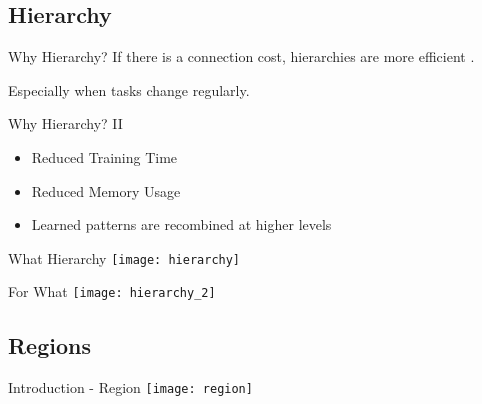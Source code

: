 
\subsection{Hierarchy}


\begin{frame}[c]{Why Hierarchy?}
    \Large
    \pause
    If there is a connection cost, hierarchies are more efficient \cite{mengistu2016evolutionary}. 
    
    \pause
    Especially when tasks change regularly.
\end{frame}


\begin{frame}[c]{Why Hierarchy? II}
    \Large
    \begin{itemize}[<+(1)->]
        \item Reduced Training Time
        \item Reduced Memory Usage
        \item Learned patterns are recombined at higher levels
    \end{itemize}
\end{frame}


\begin{frame}[c]{What Hierarchy}
    \pause
    \texttt{[image: hierarchy]}
\end{frame}


\begin{frame}[c]{For What}
    \texttt{[image: hierarchy\_2]} 
\end{frame}


\subsection{Regions}

\begin{frame}[c]{Introduction - Region}
    \pause
    \texttt{[image: region]}
\end{frame}




